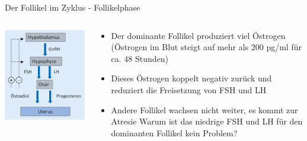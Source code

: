 \documentclass{beamer}
\begin{document}

\begin{frame}{Der Follikel im Zyklus - Follikelphase}

\begin{columns}[c]

\begin{column}{4cm}

\begin{center}
\includegraphics[width=\textwidth]{hypothalamus_hypophyse_ovar.png}
\end{center}

\end{column}

\begin{column}{7cm}
\begin{itemize}
    \item 
    Der dominante Follikel produziert viel Östrogen (Östrogen im Blut steigt auf mehr als  200 pg/ml für ca. 48 Stunden)
    \pause
    \item
    Dieses Östrogen koppelt negativ zurück und reduziert die Freisetzung von FSH und LH
    \pause
    \item
    Andere Follikel wachsen nicht weiter, es kommt zur Atresie
    \pause
    \textcolor{theme}{Warum ist das niedrige FSH und LH für den dominanten Follikel kein Problem? }
    
\end{itemize}
\end{column}
\end{columns}
\end{frame}
\end{document}
